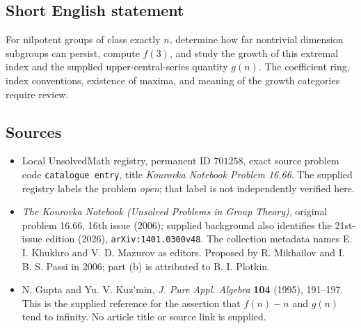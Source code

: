 \documentclass[11pt]{article}
\begin{document}
\subsection{Short English statement}
For nilpotent groups of class exactly \(n\), determine how far nontrivial dimension subgroups can persist, compute \(f(3)\), and study the growth of this extremal index and the supplied upper-central-series quantity \(g(n)\). The coefficient ring, index conventions, existence of maxima, and meaning of the growth categories require review.
\subsection{Sources}
\begin{itemize}
\item Local UnsolvedMath registry, permanent ID \(701258\), exact source problem code \texttt{catalogue entry}, title \emph{Kourovka Notebook Problem 16.66}. The supplied registry labels the problem \emph{open}; that label is not independently verified here.
\item \emph{The Kourovka Notebook (Unsolved Problems in Group Theory)}, original problem 16.66, 16th issue (2006); supplied background also identifies the 21st-issue edition (2026), \texttt{arXiv:1401.0300v48}. The collection metadata names E. I. Khukhro and V. D. Mazurov as editors. Proposed by R. Mikhailov and I. B. S. Passi in 2006; part (b) is attributed to B. I. Plotkin.
\item N. Gupta and Yu. V. Kuz'min, \emph{J. Pure Appl. Algebra} \textbf{104} (1995), 191--197. This is the supplied reference for the assertion that \(f(n)-n\) and \(g(n)\) tend to infinity. No article title or source link is supplied.
\end{itemize}
\end{document}
